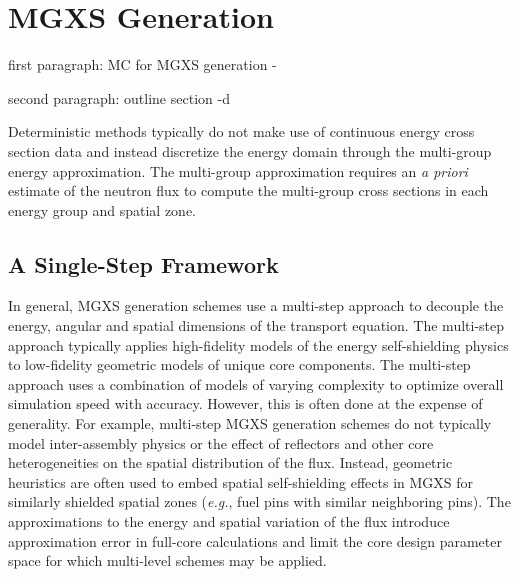 \section{MGXS Generation}
\label{sec:mgxs-generation}

first paragraph: MC for MGXS generation
-

second paragraph: outline section
-d

Deterministic methods typically do not make use of continuous energy cross section data and instead discretize the energy domain through the multi-group energy approximation. The multi-group approximation requires an \textit{a priori} estimate of the neutron flux to compute the multi-group cross sections in each energy group and spatial zone.



\subsection{A Single-Step Framework}
\label{subsec:single-level}

In general, MGXS generation schemes use a multi-step approach to decouple the energy, angular and spatial dimensions of the transport equation. The multi-step approach typically applies high-fidelity models of the energy self-shielding physics to low-fidelity geometric models of unique core components. The multi-step approach uses a combination of models of varying complexity to optimize overall simulation speed with accuracy. However, this is often done at the expense of generality. For example, multi-step MGXS generation schemes do not typically model inter-assembly physics or the effect of reflectors and other core heterogeneities on the spatial distribution of the flux. Instead, geometric heuristics are often used to embed spatial self-shielding effects in MGXS for similarly shielded spatial zones (\textit{e.g.}, fuel pins with similar neighboring pins). The approximations to the energy and spatial variation of the flux introduce approximation error in full-core calculations and limit the core design parameter space for which multi-level schemes may be applied. 

